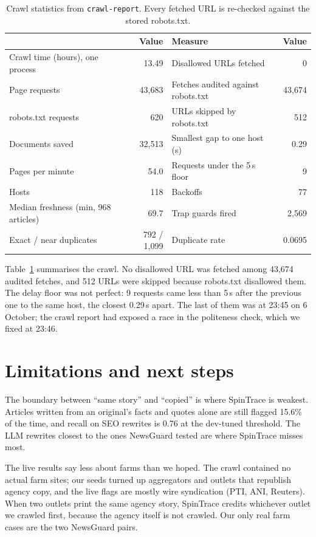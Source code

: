 \documentclass[11pt,a4paper]{article}
\newcommand{\hd}[1]{{\headfont\bfseries\footnotesize #1}}
\newcommand{\hrow}{\rowcolor{paper}}
\newcommand{\code}[1]{\texttt{#1}}
\begin{document}
\begin{table}[t]
  \centering\small
  \caption{Crawl statistics from \code{crawl-report}. Every fetched URL is re-checked against the stored robots.txt.}
  \label{tab:crawl}
  \begin{tabularx}{\textwidth}{@{}Xr@{\hspace{2.2em}}Xr@{}}
    \toprule
    \hrow \hd{Measure} & \hd{Value} & \hd{Measure} & \hd{Value} \\
    \midrule
    Crawl time (hours), one process & 13.49 & Disallowed URLs fetched & 0 \\
    Page requests & 43,683 & Fetches audited against robots.txt & 43,674 \\
    robots.txt requests & 620 & URLs skipped by robots.txt & 512 \\
    Documents saved & 32,513 & Smallest gap to one host (s) & 0.29 \\
    Pages per minute & 54.0 & Requests under the 5\,s floor & 9 \\
    Hosts & 118 & Backoffs & 77 \\
    Median freshness (min, 968 articles) & 69.7 & Trap guards fired & 2,569 \\
    Exact / near duplicates & 792 / 1,099 & Duplicate rate & 0.0695 \\
    \bottomrule
  \end{tabularx}
\end{table}

Table~\ref{tab:crawl} summarises the crawl. No disallowed URL was fetched among 43,674 audited fetches, and 512 URLs were skipped because robots.txt disallowed them. The delay floor was not perfect: 9 requests came less than 5\,s after the previous one to the same host, the closest 0.29\,s apart. The last of them was at 23:45 on 6 October; the crawl report had exposed a race in the politeness check, which we fixed at 23:46.

\section{Limitations and next steps}

The boundary between ``same story'' and ``copied'' is where SpinTrace is weakest. Articles written from an original's facts and quotes alone are still flagged 15.6\% of the time, and recall on SEO rewrites is 0.76 at the dev-tuned threshold. The LLM rewrites closest to the ones NewsGuard tested are where SpinTrace misses most.

The live results say less about farms than we hoped. The crawl contained no actual farm sites; our seeds turned up aggregators and outlets that republish agency copy, and the live flags are mostly wire syndication (PTI, ANI, Reuters). When two outlets print the same agency story, SpinTrace credits whichever outlet we crawled first, because the agency itself is not crawled. Our only real farm cases are the two NewsGuard pairs.
\end{document}
